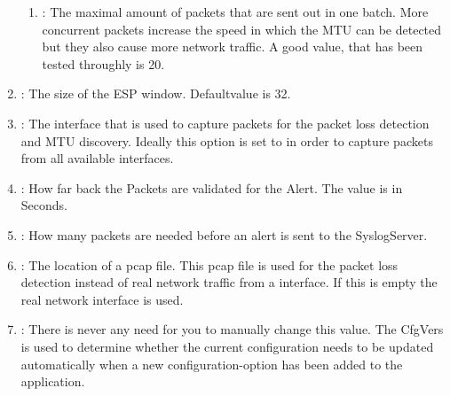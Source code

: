 \begin{enumerate}
\begin{enumerate}
	  \item {}: The maximal amount of packets that are sent out in one batch. More concurrent packets increase the speed in which the \acs{MTU} can be detected but they also cause more network traffic. A good value, that has been tested throughly is 20.
  \end{enumerate}
  \item {}: The size of the ESP window. Defaultvalue is 32.
  \item {}: The interface that is used to capture packets for the packet loss detection and \acs{MTU} discovery. Ideally this option is set to  in order to capture packets from all available interfaces. 
  \item {}:  How far back the Packets are validated for the Alert. The value is in Seconds.
  \item {}: How many packets are needed before an alert is sent to the SyslogServer.
  \item {}: The location of a pcap file. This pcap file is used for the packet loss detection instead of real network traffic from a interface. If this is empty the real network interface is used.
  \item {}: There is never any need for you to manually change this value. The CfgVers is used to determine whether the current configuration needs to be updated automatically when a new configuration-option has been added to the application.
\end{enumerate}


